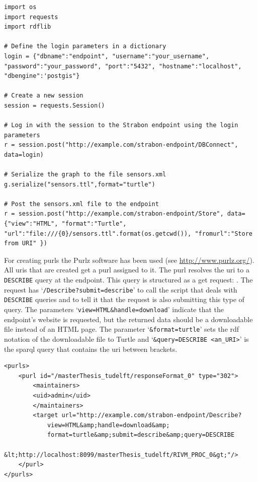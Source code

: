 \begin{lstlisting}[float,caption={Serializing the RDFlib graph object and posting it to the Strabon endpoint}, label={lst:rdflib2}]
import os
import requests
import rdflib

# Define the login parameters in a dictionary
login = {"dbname":"endpoint", "username":"your_username", "password":"your_password", "port":"5432", "hostname":"localhost", "dbengine":'postgis"}

# Create a new session
session = requests.Session()

# Log in with the session to the Strabon endpoint using the login parameters
r = session.post("http://example.com/strabon-endpoint/DBConnect", data=login)

# Serialize the graph to the file sensors.xml
g.serialize("sensors.ttl",format="turtle")

# Post the sensors.xml file to the endpoint
r = session.post("http://example.com/strabon-endpoint/Store", data={"view":"HTML", "format":"Turtle", "url":"file:///{0}/sensors.ttl".format(os.getcwd()), "fromurl":"Store from URI" }) 
\end{lstlisting}  


For creating \aclp{purl} the Purlz software has been used (see \url{http://www.purlz.org/}). All \acp{uri} that are created get a \ac{purl} assigned to it. The \ac{purl} resolves the \ac{uri} to a \texttt{DESCRIBE} query at the endpoint. This query is structured as a get request: \texttt{}. The request has `\texttt{/Describe?submit=describe}' to call the script that deals with \texttt{DESCRIBE} queries and to tell it that the request is also submitting this type of query. The parameters `\texttt{view=HTML\&handle=download}' indicate that the endpoint's website is requested, but the returned data should be a downloadable file instead of an HTML page. The parameter `\texttt{\&format=turtle}' sets the \ac{rdf} notation of the downloadable file to Turtle and `\texttt{\&query=DESCRIBE <an\_URI>}' is the \ac{sparql} query that contains the \ac{uri} between brackets. 

\begin{lstlisting}[float,caption={Example of a PURL batch file (containing one PURL)}, label={lst:PURL}]
<purls>
	<purl id="/masterThesis_tudelft/responseFormat_0" type="302">
		<maintainers>
		<uid>admin</uid>
		</maintainers>
		<target url="http://example.com/strabon-endpoint/Describe?
			view=HTML&amp;handle=download&amp;
			format=turtle&amp;submit=describe&amp;query=DESCRIBE 
			&lt;http://localhost:8099/masterThesis_tudelft/RIVM_PROC_0&gt;"/>
	</purl>
</purls>
\end{lstlisting}

